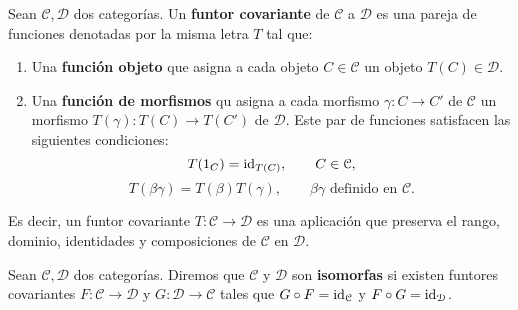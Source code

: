 \begin{definicion}
	Sean $\mathcal{C}, \mathcal{D}$ dos categorías. Un \textbf{funtor covariante} de
	$\mathcal{C}$ a $\mathcal{D}$ es una pareja de funciones denotadas por la misma
	letra $T$ tal que:
	\begin{enumerate}
		\item Una \textbf{función objeto} que asigna a cada objeto
		$C \in \mathcal{C}$ un objeto $T(C) \in \mathcal{D}$.
		
		\item Una \textbf{función de morfismos} qu asigna a cada morfismo
		$\gamma: C \rightarrow C'$ de $\mathcal{C}$ un morfismo
		$T(\gamma): T(C) \rightarrow T(C')$ de $\mathcal{D}$. Este par de funciones
		satisfacen las siguientes condiciones:
		\begin{equation}
			T(1_{C}) = \operatorname{id}_{T(C)}, \qquad C \in \mathcal{C},
		\end{equation}
		\begin{equation}
			T(\beta \gamma) = T(\beta)T(\gamma), \qquad \beta \gamma \text{ definido
				en }\mathcal{C}.
		\end{equation}
	\end{enumerate}
\end{definicion}

Es decir, un funtor covariante $T: \mathcal{C}\rightarrow \mathcal{D}$ es una aplicación
que preserva el rango, dominio, identidades y composiciones de $\mathcal{C}$ en $\mathcal{D}$.

\begin{definicion}
	Sean $\mathcal{C}, \mathcal{D}$ dos categorías. Diremos que $\mathcal{C}$ y
	$\mathcal{D}$ son \textbf{isomorfas} si existen funtores covariantes $F: \mathcal{C}
	\to \mathcal{D}$ y $G: \mathcal{D}\to \mathcal{C}$ tales que $G \circ F = \operatorname{id}_{\mathcal{C}}$
	y $F \circ G = \operatorname{id}_{\mathcal{D}}$.
\end{definicion}

%
